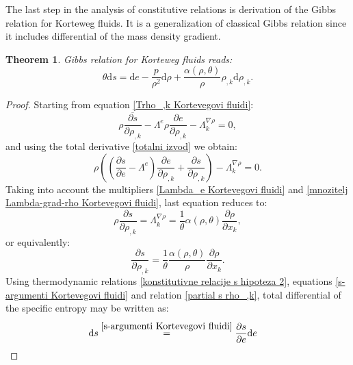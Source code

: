 \documentclass[a4paper,fleqn]{cas-sc}
\newtheorem{theorem}{Theorem}[section]
\theoremstyle{definition}
\begin{document}
The last step in the analysis of constitutive relations is derivation of the Gibbs relation for Korteweg fluids. It is a generalization of classical Gibbs relation since it includes differential of the mass density gradient. 

\begin{theorem} 
	Gibbs relation for Korteweg fluids reads: 
	\begin{equation} \label{Gibsova relacija Kortevegovi fluidi}
		\theta \mathrm{d}s = \mathrm{d}e - \dfrac{p}{\rho^2} \mathrm{d}\rho 
		+ \dfrac{\alpha(\rho,\theta)}{\rho} \rho_{,k} \mathrm{d}\rho_{,k}.
	\end{equation}
\end{theorem}

\begin{proof}
	Starting from equation \eqref{Trho_,k Kortevegovi fluidi}:
	\begin{equation*}
		\rho\overline{\dfrac{\partial s}{\partial\rho_{,k}}} 
		- \Lambda^e\rho\dfrac{\partial e}{\partial\rho_{,k}} - \Lambda^{\nabla\rho}_k = 0,
	\end{equation*}
	and using the total derivative \eqref{totalni izvod} we obtain:
	\begin{equation*}
		\rho\left(\left(\dfrac{\partial s}{\partial e} - \Lambda^e \right) 
		\dfrac{\partial e}{\partial\rho_{,k}} 
		+ \dfrac{\partial s}{\partial\rho_{,k}}\right) 
		- \Lambda_k^{\nabla\rho} = 0.
	\end{equation*}
	Taking into account the multipliers \eqref{Lambda_e Kortevegovi fluidi} and \eqref{mnozitelj Lambda-grad-rho Kortevegovi fluidi}, last equation reduces to:
	\begin{equation*}
		\rho\dfrac{\partial s}{\partial\rho_{,k}} = \Lambda_k^{\nabla\rho} 
		= \dfrac{1}{\theta} \alpha(\rho,\theta) \dfrac{\partial\rho}{\partial x_k},
	\end{equation*}
	or equivalently:
	\begin{equation} \label{partial s rho_,k}
		\dfrac{\partial s}{\partial\rho_{,k}} 
		= \dfrac{1}{\theta} \dfrac{\alpha(\rho,\theta)}{\rho} \dfrac{\partial\rho}{\partial x_k}.
	\end{equation}
	Using thermodynamic relations \eqref{konstitutivne relacije s hipoteza 2}, equations \eqref{s-argumenti Kortevegovi fluidi} and relation \eqref{partial s rho_,k}, total differential of the specific entropy may be written as:
	\begin{align*}
		\mathrm{d}s & \overset{\eqref{s-argumenti Kortevegovi fluidi}}{=} 
		\dfrac{\partial s}{\partial e} \mathrm{d}e 

\end{align*}
\end{proof}
\end{document}

